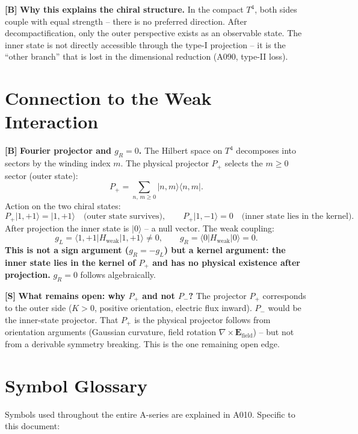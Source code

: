 \textbf{[B]} \textbf{Why this explains the chiral structure.} In the compact
$T^4$, both sides couple with equal strength -- there is no preferred direction.
After decompactification, only the outer perspective exists as an observable
state. The inner state is not directly accessible through the type-I projection
-- it is the ``other branch'' that is lost in the dimensional reduction (A090,
type-II loss).

\section{Connection to the Weak Interaction}

\textbf{[B]} \textbf{Fourier projector and $g_R=0$.} The Hilbert space on $T^4$
decomposes into sectors by the winding index $m$. The physical projector $P_+$
selects the $m\ge0$ sector (outer state):
\[
  P_+ = \sum_{n,\,m\ge0} |n,m\rangle\langle n,m|.
\]
Action on the two chiral states:
\[
  P_+|1,{+}1\rangle = |1,{+}1\rangle \quad\text{(outer state survives)},
  \qquad
  P_+|1,{-}1\rangle = 0 \quad\text{(inner state lies in the kernel)}.
\]
After projection the inner state is $|0\rangle$ -- a null vector.
The weak coupling:
\[
  g_L = \langle 1,{+}1|H_\text{weak}|1,{+}1\rangle \neq 0,
  \qquad
  g_R = \langle 0|H_\text{weak}|0\rangle = 0.
\]
\textbf{This is not a sign argument ($g_R=-g_L$) but a kernel argument: the
inner state lies in the kernel of $P_+$ and has no physical existence after
projection.} $g_R=0$ follows algebraically.

\textbf{[S]} \textbf{What remains open: why $P_+$ and not $P_-$?}
The projector $P_+$ corresponds to the outer side ($K>0$, positive orientation,
electric flux inward). $P_-$ would be the inner-state projector. That $P_+$ is
the physical projector follows from orientation arguments (Gaussian curvature,
field rotation $\nabla\times\mathbf{E}_\text{field}$) -- but not from a
derivable symmetry breaking. This is the one remaining open edge.

\section{Symbol Glossary}

Symbols used throughout the entire A-series are explained in A010.
Specific to this document:

